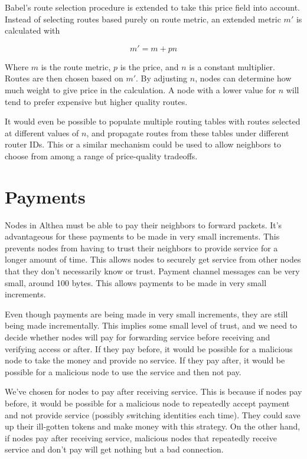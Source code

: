 \documentclass[11pt]{article}
\newlength{\currentparskip}
\newenvironment{unbreakable}
  {\setlength{\currentparskip}{\parskip}%
	 \vspace{\currentparskip}
   \begin{minipage}{\textwidth}%
   \setlength{\parskip}{\currentparskip}%
  }
  {\end{minipage}\vspace{\currentparskip}}
\begin{document}
\begin{unbreakable}
Babel’s route selection procedure is extended to take this price field into account. Instead of selecting routes based purely on route metric, an extended metric $m'$ is calculated with

\[
m'= m+pn
\]

Where $m$ is the route metric, $p$ is the price, and $n$ is a constant multiplier. Routes are then chosen based on $m'$. By adjusting $n$, nodes can determine how much weight to give price in the calculation. A node with a lower value for $n$ will tend to prefer expensive but higher quality routes.
\end{unbreakable}

It would even be possible to populate multiple routing tables with routes selected at different values of $n$, and propagate routes from these tables under different router IDs. This or a similar mechanism could be used to allow neighbors to choose from among a range of price-quality tradeoffs.

\section{Payments}
\label{sec:payments}
Nodes in Althea must be able to pay their neighbors to forward packets. It’s advantageous for these payments to be made in very small increments. This prevents nodes from having to trust their neighbors to provide service for a longer amount of time. This allows nodes to securely get service from other nodes that they don’t necessarily know or trust. Payment channel messages can be very small, around 100 bytes. This allows payments to be made in very small increments.

Even though payments are being made in very small increments, they are still being made incrementally. This implies some small level of trust, and we need to decide whether nodes will pay for forwarding service before receiving and verifying access or after. If they pay before, it would be possible for a malicious node to take the money and provide no service. If they pay after, it would be possible for a malicious node to use the service and then not pay.

We’ve chosen for nodes to pay after receiving service. This is because if nodes pay before, it would be possible for a malicious node to repeatedly accept payment and not provide service (possibly switching identities each time). They could save up their ill-gotten tokens and make money with this strategy. On the other hand, if nodes pay after receiving service, malicious nodes that repeatedly receive service and don’t pay will get nothing but a bad connection.
\end{document}
